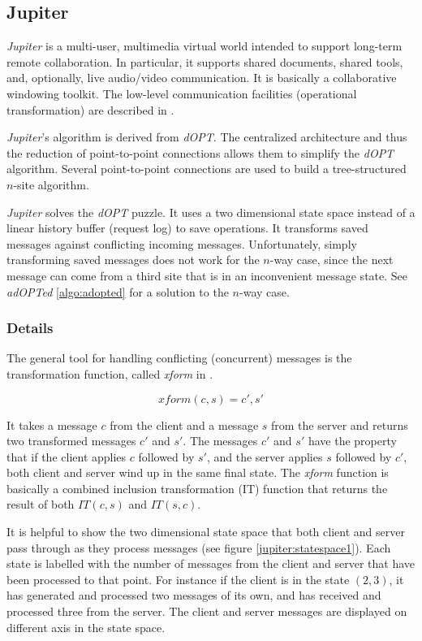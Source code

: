 \subsection{Jupiter}
\label{algo:jupiter}

\emph{Jupiter} is a multi-user, multimedia virtual world intended to support long-term remote collaboration. In particular, it supports shared documents, shared tools, and, optionally, live audio/video communication. It is basically a collaborative windowing toolkit. The low-level communication facilities (operational transformation) are described in \cite{jupiter95}.

\emph{Jupiter}'s algorithm is derived from \emph{dOPT}. The centralized architecture and thus the reduction of point-to-point connections allows them to simplify the \emph{dOPT} algorithm. Several point-to-point connections are used to build a tree-structured $n$-site algorithm.

\emph{Jupiter} solves the \emph{dOPT} puzzle. It uses a two dimensional state space instead of a linear history buffer (request log) to save operations. It transforms saved messages against conflicting incoming messages. Unfortunately, simply transforming saved messages does not work for the $n$-way case, since the next message can come from a third site that is in an inconvenient message state. See \emph{adOPTed} \ref{algo:adopted} for a solution to the $n$-way case.


\subsubsection{Details}

The general tool for handling conflicting (concurrent) messages is the transformation function, called \emph{xform} in \cite{jupiter95}.

$$ xform(c,s)={c',s'} $$

It takes a message $c$ from the client and a message $s$ from the server and returns two transformed messages $c'$ and $s'$. The messages $c'$ and $s'$ have the property that if the client applies $c$ followed by $s'$, and the server applies $s$ followed by $c'$, both client and server wind up in the same final state. The \emph{xform} function is basically a combined inclusion transformation (IT) function that returns the result of both $IT(c,s)$ and $IT(s,c)$.

It is helpful to show the two dimensional state space that both client and server pass through as they process messages (see figure \ref{jupiter:statespace1}). Each state is labelled with the number of messages from the client and server that have been processed to that point. For instance if the client is in the state $(2,3)$, it has generated and processed two messages of its own, and has received and processed three from the server. The client and server messages are displayed on different axis in the state space. 

